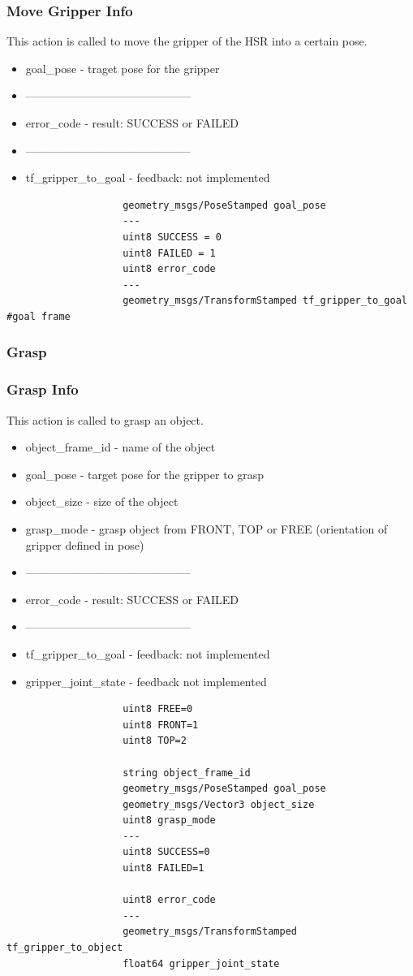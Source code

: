 \documentclass[main.tex]{subfiles}
\begin{document}
				\subsubsection{Move Gripper Info}
				This action is called to move the gripper of the HSR into a certain pose.
				\begin{itemize}
					\item goal\_pose - traget pose for the gripper
					\item --------------------------------------------
					\item error\_code - result: SUCCESS or FAILED
					\item --------------------------------------------
					\item tf\_gripper\_to\_goal - feedback: not implemented
				\end{itemize}
					\begin{lstlisting}
					geometry_msgs/PoseStamped goal_pose
					---
					uint8 SUCCESS = 0
					uint8 FAILED = 1
					uint8 error_code
					---
					geometry_msgs/TransformStamped tf_gripper_to_goal #goal frame
					\end{lstlisting}
				\subsubsection{Grasp}
				\label{msg_grasp}
				\subsubsection{Grasp Info}
				This action is called to grasp an object.
				\begin{itemize}
					\item object\_frame\_id - name of the object
					\item goal\_pose - target pose for the gripper to grasp
					\item object\_size - size of the object
					\item grasp\_mode - grasp object from FRONT, TOP or FREE (orientation of gripper defined in pose)
					\item --------------------------------------------
					\item error\_code - result: SUCCESS or FAILED
					\item --------------------------------------------
					\item tf\_gripper\_to\_goal - feedback: not implemented
					\item gripper\_joint\_state - feedback not implemented
				\end{itemize}
					\begin{lstlisting}
					uint8 FREE=0
					uint8 FRONT=1
					uint8 TOP=2
		
					string object_frame_id
					geometry_msgs/PoseStamped goal_pose 
					geometry_msgs/Vector3 object_size
					uint8 grasp_mode
					---
					uint8 SUCCESS=0
					uint8 FAILED=1
		
					uint8 error_code
					---
					geometry_msgs/TransformStamped tf_gripper_to_object
					float64 gripper_joint_state
					\end{lstlisting}
\end{document}
